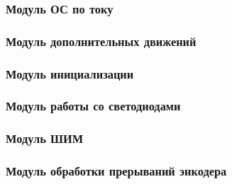 %
%

\newpage
\subsubsection{Модуль ОС по току}
\label{module_current_feedback}



\newpage
\subsubsection{Модуль дополнительных движений}
\label{module_elementary_motions}



\newpage
\subsubsection{Модуль инициализации}
\label{module_init}



\newpage
\subsubsection{Модуль работы со светодиодами}
\label{module_led_control}



\newpage
\subsubsection{Модуль ШИМ}
\label{module_pwm_wrap_module}



\newpage
\subsubsection{Модуль обработки прерываний энкодера}
\label{module_sensors_encoder}



